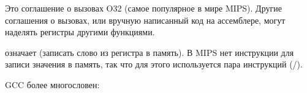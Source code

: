 Это соглашение о вызовах O32 (самое популярное в мире MIPS).
Другие соглашения о вызовах, или вручную написанный код на ассемблере, могут наделять регистры другими функциями.

 означает  (записать слово из регистра в память).
В MIPS нет инструкции для записи значения в память, так что для этого используется пара инструкций (/).






\NonOptimizing GCC более многословен:





